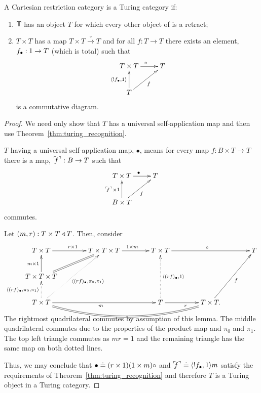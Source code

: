 \begin{lemma}\label{lem:t_t_to_t_gives_a_turing_category}
  A Cartesian restriction category \T is a Turing category if:
  \begin{enumerate}[{(}i{)}]
  \item $\mathbb{T}$ has an object $T$ for which every other object of \D is a retract;
  \item $T\times T$ has a map  $T\times T \xrightarrow{\ \circ\ }T$ and for all
    $f:T\to T$ there exists an element, $f_{\bullet}:1\to T$ (which is total) such that
      \[
        \xymatrix{
          T\times T \ar[r]^{\circ} & T \\
          T \ar[ur]_{f} \ar[u]^{\<!\code{f},1\>}
        }
      \]
    is a commutative diagram.
  \end{enumerate}
\end{lemma}
\begin{proof}
  We need only show that $T$ has a universal self-application map and then use
  Theorem~\ref{thm:turing_recognition}.

  $T$ having a universal self-application map, $\bullet$, means for every map $f:B\times T \to T$ there is a
  map, ${}^\ulcorner\!\!f^\urcorner:B\to T$ such that
  \[
    \xymatrix{
      T\times T \ar[r]^{\bullet} & T \\
      B\times T \ar[ur]_{f} \ar[u]^{\name{f}\times1}
    }
  \]
  commutes.

  Let $(m,r):T\times T\triangleleft T$. Then, consider
  \[
    \xymatrix@C+15pt{
     T\times T \ar[r]^{r\times 1} & T\times T\times T \ar[r]^{1\times m} &T\times T \ar[rr]^{\circ}
       && T \\
     T\times T\times T \ar[u]^{m\times 1} \ar@{=}[ur]\\
     T\times T \ar@{.>}[u]^{\<\code{(rf)},\pi_0,\pi_1\>} \ar@{.>}[uur]_{\<\code{(rf)},\pi_0,\pi_1\>}
       \ar[rr]_{m} \ar@{=}@/_20pt/[rrr]
       & & T \ar[r]_{r} \ar@{.>}[uu]_{\<\code{(rf)},1\>} &T\times T. \ar[uur]_{f}
    }
  \]
  The rightmost quadrilateral commutes by assumption of this lemma. The middle quadrilateral
  commutes due to the properties of the product map and $\pi_0$ and $\pi_1$. The top left triangle
  commutes as $m r = 1$ and the remaining triangle has the same map on both dotted lines.

  Thus, we may conclude that $\bullet \doteq (r \times 1)(1\times m) \circ$ and
  ${}^\ulcorner\!\!f^\urcorner\doteq \langle!f_{\bullet},1\rangle m$ satisfy the requirements of
  Theorem~\ref{thm:turing_recognition} and therefore $T$ is a Turing object in a Turing category.
\end{proof}

